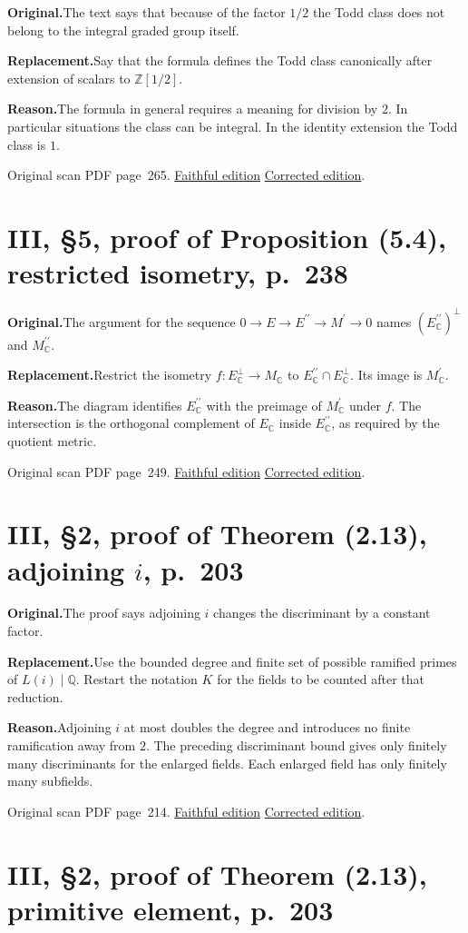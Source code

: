 \documentclass[11pt,a4paper]{article}
\newcommand{\original}{\par\smallskip\noindent\textbf{Original.}\enspace}
\newcommand{\replacement}{\par\smallskip\noindent\textbf{Replacement.}\enspace}
\newcommand{\reason}{\par\smallskip\noindent\textbf{Reason.}\enspace}
\newcommand{\editionlink}[3]{\href{#1\#errata.#2}{#3}}
\newcommand{\location}[2]{%
  \par\smallskip\noindent Original scan PDF page~#2.\enspace
  \editionlink{Neukirch_Faithful.pdf}{#1}{Faithful edition}
  \quad\editionlink{Neukirch_Corrected.pdf}{#1}{Corrected edition}.}
\begin{document}
\original The text says that because of the factor $1/2$ the Todd class does not belong to the integral graded group itself.
\replacement Say that the formula defines the Todd class canonically after extension of scalars to $\mathbb Z[1/2]$.
\reason The formula in general requires a meaning for division by $2$. In particular situations the class can be integral. In the identity extension the Todd class is $1$.
\location{89}{265}

\setcounter{section}{89}
\section{III, \S5, proof of Proposition (5.4), restricted isometry, p.~238}\label{errata:item:90}

\original The argument for the sequence $0\to E\to E^{\prime\prime}\to M^{\prime}\to0$ names $(E^{\prime\prime}_{\mathbb C})^\perp$ and $M^{\prime\prime}_{\mathbb C}$.
\replacement Restrict the isometry $f:E_{\mathbb C}^\perp\to M_{\mathbb C}$ to $E^{\prime\prime}_{\mathbb C}\cap E_{\mathbb C}^\perp$. Its image is $M^{\prime}_{\mathbb C}$.
\reason The diagram identifies $E^{\prime\prime}_{\mathbb C}$ with the preimage of $M^{\prime}_{\mathbb C}$ under $f$. The intersection is the orthogonal complement of $E_{\mathbb C}$ inside $E^{\prime\prime}_{\mathbb C}$, as required by the quotient metric.
\location{90}{249}

\setcounter{section}{90}
\section{III, \S2, proof of Theorem (2.13), adjoining $i$, p.~203}\label{errata:item:91}

\original The proof says adjoining $i$ changes the discriminant by a constant factor.
\replacement Use the bounded degree and finite set of possible ramified primes of $L(i)\mid\mathbb Q$. Restart the notation $K$ for the fields to be counted after that reduction.
\reason Adjoining $i$ at most doubles the degree and introduces no finite ramification away from $2$. The preceding discriminant bound gives only finitely many discriminants for the enlarged fields. Each enlarged field has only finitely many subfields.
\location{91}{214}

\setcounter{section}{91}
\section{III, \S2, proof of Theorem (2.13), primitive element, p.~203}\label{errata:item:92}
\end{document}
